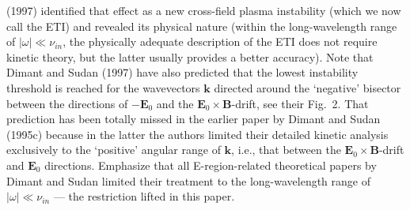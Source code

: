 \documentclass[draft]{agujournal2019}
\renewcommand{\vec}{\mathbf}
\begin{document}
{(1997) identified that effect as a new cross-field plasma instability (which
we now call the ETI) and revealed its physical nature (within the long-wavelength range of
$|\omega|\ll\nu_{in}$, the physically adequate description of the ETI does not
require kinetic theory, but the latter usually provides a better accuracy). Note that Dimant and Sudan (1997)
have also predicted that the lowest instability threshold is reached for the
wavevectors $\vec{k}$ directed around the `negative' bisector between the
directions of $-\vec{E}_{0}$ and the $\vec{E}_{0}\times\vec{B}$-drift, see
their Fig.~2. That prediction has been totally missed in the earlier paper
by Dimant and Sudan (1995c) because in the latter the authors limited their detailed
kinetic analysis exclusively to the `positive' angular range of $\vec{k}$, i.e., that
between the $\vec{E}_{0}\times\vec{B}$-drift and $\vec{E}_{0}$ directions.
Emphasize that all E-region-related theoretical papers by Dimant and Sudan
limited their treatment to the long-wavelength range of $|\omega|\ll\nu_{in}$
--- the restriction lifted in this paper.}

\end{document}
